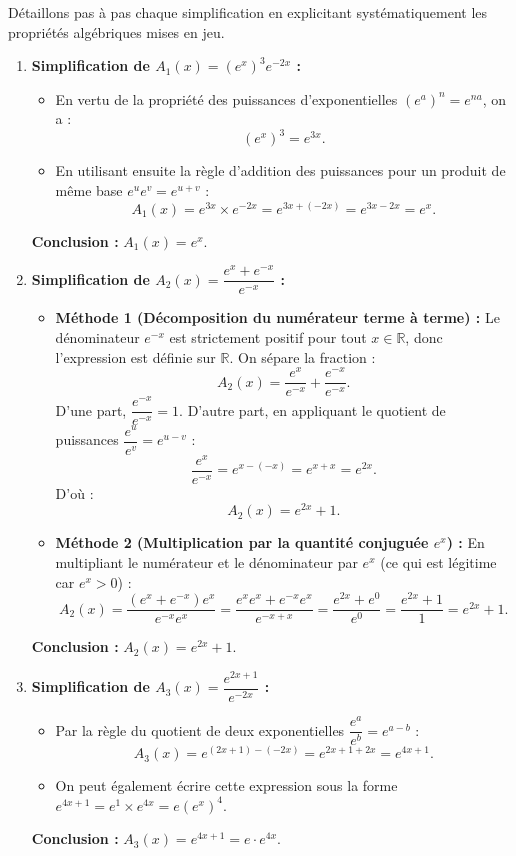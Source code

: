 \documentclass[11pt,a4paper]{article}
\newcommand{\R}{\mathbb{R}}
\begin{document}
\begin{correctionbox}[Exercice 1]
Détaillons pas à pas chaque simplification en explicitant systématiquement les propriétés algébriques mises en jeu.

\begin{enumerate}[label=\textbf{\arabic*.}]
    \item \textbf{Simplification de $A_1(x) = (e^x)^3 e^{-2x}$ :}
    \begin{itemize}
        \item En vertu de la propriété des puissances d'exponentielles $(e^a)^n = e^{na}$, on a :
        \[
        (e^x)^3 = e^{3x}.
        \]
        \item En utilisant ensuite la règle d'addition des puissances pour un produit de même base $e^u e^v = e^{u+v}$ :
        \[
        A_1(x) = e^{3x} \times e^{-2x} = e^{3x + (-2x)} = e^{3x - 2x} = e^x.
        \]
    \end{itemize}
    \textbf{Conclusion :} $\boxed{A_1(x) = e^x}$.

    \item \textbf{Simplification de $A_2(x) = \dfrac{e^x + e^{-x}}{e^{-x}}$ :}
    \begin{itemize}
        \item \textbf{Méthode 1 (Décomposition du numérateur terme à terme) :}
        Le dénominateur $e^{-x}$ est strictement positif pour tout $x \in \R$, donc l'expression est définie sur $\R$. On sépare la fraction :
        \[
        A_2(x) = \frac{e^x}{e^{-x}} + \frac{e^{-x}}{e^{-x}}.
        \]
        D'une part, $\dfrac{e^{-x}}{e^{-x}} = 1$. D'autre part, en appliquant le quotient de puissances $\dfrac{e^u}{e^v} = e^{u-v}$ :
        \[
        \frac{e^x}{e^{-x}} = e^{x - (-x)} = e^{x+x} = e^{2x}.
        \]
        D'où :
        \[
        A_2(x) = e^{2x} + 1.
        \]
        \item \textbf{Méthode 2 (Multiplication par la quantité conjuguée $e^x$) :}
        En multipliant le numérateur et le dénominateur par $e^x$ (ce qui est légitime car $e^x > 0$) :
        \[
        A_2(x) = \frac{(e^x + e^{-x})e^x}{e^{-x}e^x} = \frac{e^x e^x + e^{-x}e^x}{e^{-x+x}} = \frac{e^{2x} + e^0}{e^0} = \frac{e^{2x} + 1}{1} = e^{2x} + 1.
        \]
    \end{itemize}
    \textbf{Conclusion :} $\boxed{A_2(x) = e^{2x} + 1}$.

    \item \textbf{Simplification de $A_3(x) = \dfrac{e^{2x+1}}{e^{-2x}}$ :}
    \begin{itemize}
        \item Par la règle du quotient de deux exponentielles $\dfrac{e^a}{e^b} = e^{a-b}$ :
        \[
        A_3(x) = e^{(2x+1) - (-2x)} = e^{2x + 1 + 2x} = e^{4x+1}.
        \]
        \item On peut également écrire cette expression sous la forme $e^{4x+1} = e^1 \times e^{4x} = e (e^x)^4$.
    \end{itemize}
    \textbf{Conclusion :} $\boxed{A_3(x) = e^{4x+1} = e \cdot e^{4x}}$.


\end{enumerate}
\end{correctionbox}
\end{document}
